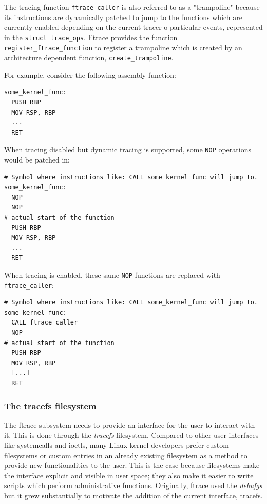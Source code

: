 The tracing function \verb|ftrace_caller| is also referred to as a "trampoline"
because its instructions are dynamically patched to jump to the functions which
are currently enabled depending on the current tracer o particular events,
represented in the \verb|struct trace_ops|. Ftrace provides the function
\verb|register_ftrace_function| to register a trampoline which is created by an
architecture dependent function, \verb|create_trampoline|.

For example, consider the following assembly function:

\begin{verbatim}
some_kernel_func:
  PUSH RBP
  MOV RSP, RBP
  ...
  RET
\end{verbatim}

When tracing disabled but dynamic tracing is supported, some \verb|NOP|
operations would be patched in:

\begin{verbatim}
# Symbol where instructions like: CALL some_kernel_func will jump to.
some_kernel_func:
  NOP
  NOP
# actual start of the function
  PUSH RBP
  MOV RSP, RBP
  ...
  RET
\end{verbatim}

When tracing is enabled, these same \verb|NOP| functions are replaced with
\verb|ftrace_caller|:

\begin{verbatim}
# Symbol where instructions like: CALL some_kernel_func will jump to.
some_kernel_func:
  CALL ftrace_caller
  NOP
# actual start of the function
  PUSH RBP
  MOV RSP, RBP
  [...]
  RET
\end{verbatim}

\subsubsection*{The tracefs filesystem}

The ftrace subsystem needs to provide an interface for the user to interact with
it. This is done through the \textit{tracefs} filesystem. Compared to other user
interfaces like systemcalls and ioctls, many Linux kernel developers prefer
custom filesystems or custom entries in an already existing filesystem as a
method to provide new functionalities to the user. This is the case because
filesystems make the interface explicit and visible in user space; they also
make it easier to write scripts which perform administrative functions.
Originally, ftrace used the \textit{debufgs} but it grew substantially to
motivate the addition of the current interface, tracefs.

